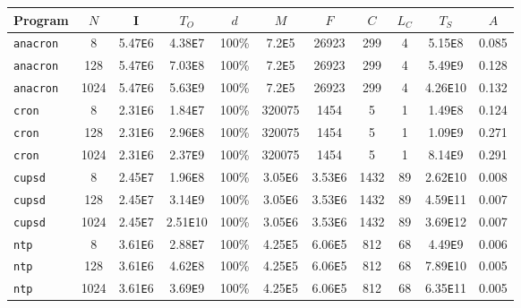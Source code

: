 \begin{table} [h]
\begin{adjustwidth}{-1cm}{}
  \centering
  \begin{tabular}{|l||c|c||c||c|c|c|c|c||c||c|}\hline
    Program & $N$ & I & $T_O$ & $d$ & $M$ & $F$ & $C$ & $L_C$ & $T_S$ & $A$ \\\hline \hline
    \texttt{anacron} & 8 & 5.47\texttt{E}6 & 4.38\texttt{E}7 & 100\% & 7.2\texttt{E}5 & 26923 & 299 & 4 & 5.15\texttt{E}8 & 0.085  \\\hline
    \texttt{anacron} & 128 & 5.47\texttt{E}6 & 7.03\texttt{E}8 & 100\% & 7.2\texttt{E}5 & 26923 & 299 & 4 & 5.49\texttt{E}9 & 0.128  \\\hline
    \texttt{anacron} & 1024 & 5.47\texttt{E}6 & 5.63\texttt{E}9 & 100\% & 7.2\texttt{E}5 & 26923 & 299 & 4 & 4.26\texttt{E}10 & 0.132  \\\hline
    \hline
    
    \texttt{cron} & 8 & 2.31\texttt{E}6 & 1.84\texttt{E}7 & 100\% & 320075 & 1454 & 5 & 1 & 1.49\texttt{E}8 & 0.124  \\\hline
    \texttt{cron} & 128 & 2.31\texttt{E}6 & 2.96\texttt{E}8 & 100\% & 320075 & 1454 & 5 & 1 & 1.09\texttt{E}9 & 0.271  \\\hline
    \texttt{cron} & 1024 & 2.31\texttt{E}6 & 2.37\texttt{E}9 & 100\% & 320075 & 1454 & 5 & 1 & 8.14\texttt{E}9 & 0.291  \\\hline
    \hline
    
    \texttt{cupsd} & 8 & 2.45\texttt{E}7 & 1.96\texttt{E}8 & 100\% & 3.05\texttt{E}6 & 3.53\texttt{E}6 & 1432 & 89 & 2.62\texttt{E}10 & 0.008  \\\hline
    \texttt{cupsd} & 128 & 2.45\texttt{E}7 & 3.14\texttt{E}9 & 100\% & 3.05\texttt{E}6 & 3.53\texttt{E}6 & 1432 & 89 & 4.59\texttt{E}11 & 0.007  \\\hline
    \texttt{cupsd} & 1024 & 2.45\texttt{E}7 & 2.51\texttt{E}10 & 100\% & 3.05\texttt{E}6 & 3.53\texttt{E}6 & 1432 & 89 & 3.69\texttt{E}12 & 0.007  \\\hline
    \hline
    
    \texttt{ntp} & 8 & 3.61\texttt{E}6 & 2.88\texttt{E}7 & 100\% & 4.25\texttt{E}5 & 6.06\texttt{E}5 & 812 & 68 & 4.49\texttt{E}9 & 0.006  \\\hline
    \texttt{ntp} & 128 & 3.61\texttt{E}6 & 4.62\texttt{E}8 & 100\% & 4.25\texttt{E}5 & 6.06\texttt{E}5 & 812 & 68 & 7.89\texttt{E}10 & 0.005  \\\hline
    \texttt{ntp} & 1024 & 3.61\texttt{E}6 & 3.69\texttt{E}9 & 100\% & 4.25\texttt{E}5 & 6.06\texttt{E}5 & 812 & 68 &  6.35\texttt{E}11  & 0.005  \\\hline
  

\end{tabular}
\end{adjustwidth}
\end{table}
